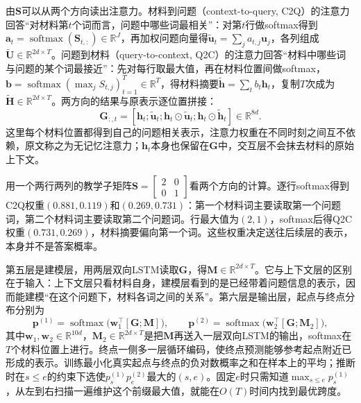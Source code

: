 由$\bm S$可以从两个方向读出注意力。材料到问题（context-to-query, C2Q）的注意力回答“对材料第$t$个词而言，问题中哪些词最相关”：对第$t$行做softmax得到$\bm a_t=\operatorname{softmax}(\bm S_{t,:})\in\mathbb R^{J}$，再加权问题向量得$\tilde{\bm u}_t=\sum_j a_{t,j}\bm u_j$，各列组成$\widetilde{\bm U}\in\mathbb R^{2d\times T}$。问题到材料（query-to-context, Q2C）的注意力回答“材料中哪些词与问题的某个词最接近”：先对每行取最大值，再在材料位置间做softmax，$\bm b=\operatorname{softmax}(\max_{j}S_{t,j})_{t=1}^{T}\in\mathbb R^{T}$，得材料摘要$\tilde{\bm h}=\sum_t b_t\bm h_t$，复制$T$次成为$\widetilde{\bm H}\in\mathbb R^{2d\times T}$。两方向的结果与原表示逐位置拼接：
\begin{equation}
  \bm G_{:,t}=[\bm h_t;\tilde{\bm u}_t;\bm h_t\odot\tilde{\bm u}_t;\bm h_t\odot\tilde{\bm h}_t]\in\mathbb R^{8d}.
  \label{eq:nlp-dialogue-bidaf-g}
\end{equation}
这里每个材料位置都得到自己的问题相关表示，注意力权重在不同时刻之间互不依赖，原文称之为无记忆注意力；$\bm h_t$本身也保留在$\bm G$中，交互层不会抹去材料的原始上下文。

用一个两行两列的教学子矩阵$\bm S=\left[\begin{smallmatrix}2&0\\0&1\end{smallmatrix}\right]$看两个方向的计算。逐行softmax得到C2Q权重$(0.881,0.119)$和$(0.269,0.731)$：第一个材料词主要读取第一个问题词，第二个材料词主要读取第二个问题词。行最大值为$(2,1)$，softmax后得Q2C权重$(0.731,0.269)$，材料摘要偏向第一个词。这些权重决定送往后续层的表示，本身并不是答案概率。

第五层是建模层，用两层双向LSTM读取$\bm G$，得$\bm M\in\mathbb R^{2d\times T}$。它与上下文层的区别在于输入：上下文层只看材料自身，建模层看到的是已经带着问题信息的表示，因而能建模“在这个问题下，材料各词之间的关系”。第六层是输出层，起点与终点分布分别为
\begin{equation}
  \bm p^{(1)}=\operatorname{softmax}\bigl(\bm w_1^{\top}[\bm G;\bm M]\bigr),\qquad
  \bm p^{(2)}=\operatorname{softmax}\bigl(\bm w_2^{\top}[\bm G;\bm M_2]\bigr),
  \label{eq:nlp-dialogue-bidaf-output}
\end{equation}
其中$\bm w_1,\bm w_2\in\mathbb R^{10d}$，$\bm M_2\in\mathbb R^{2d\times T}$是把$\bm M$再送入一层双向LSTM的输出，softmax在$T$个材料位置上进行。终点一侧多一层循环编码，使终点预测能够参考起点附近已形成的表示。训练最小化真实起点与终点的负对数概率之和在样本上的平均；推断时在$s\leq e$的约束下选使$p^{(1)}_s p^{(2)}_e$最大的$(s,e)$。固定$e$时只需知道$\max_{s\leq e}p^{(1)}_s$，从左到右扫描一遍维护这个前缀最大值，就能在$O(T)$时间内找到最优跨度。


